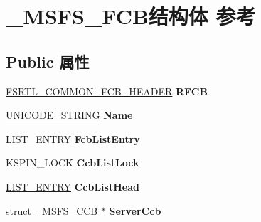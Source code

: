 \hypertarget{struct___m_s_f_s___f_c_b}{}\section{\+\_\+\+M\+S\+F\+S\+\_\+\+F\+C\+B结构体 参考}
\label{struct___m_s_f_s___f_c_b}
\subsection*{Public 属性}
\begin{DoxyCompactItemize}
\item 
\mbox{\label{struct___m_s_f_s___f_c_b_a3bf79aa4ff11a3e6f6f9dbb10cf91182}} 
\hyperlink{struct___f_s_r_t_l___c_o_m_m_o_n___f_c_b___h_e_a_d_e_r}{F\+S\+R\+T\+L\+\_\+\+C\+O\+M\+M\+O\+N\+\_\+\+F\+C\+B\+\_\+\+H\+E\+A\+D\+ER} {\bfseries R\+F\+CB}
\item 
\mbox{\label{struct___m_s_f_s___f_c_b_a2683262a7e5357d93e0bcc215387b9da}} 
\hyperlink{struct___u_n_i_c_o_d_e___s_t_r_i_n_g}{U\+N\+I\+C\+O\+D\+E\+\_\+\+S\+T\+R\+I\+NG} {\bfseries Name}
\item 
\mbox{\label{struct___m_s_f_s___f_c_b_af93da213be5b547d6215b2731fc06536}} 
\hyperlink{struct___l_i_s_t___e_n_t_r_y}{L\+I\+S\+T\+\_\+\+E\+N\+T\+RY} {\bfseries Fcb\+List\+Entry}
\item 
\mbox{\label{struct___m_s_f_s___f_c_b_ada9e82358d17e8c3413c68d8753f73cf}} 
K\+S\+P\+I\+N\+\_\+\+L\+O\+CK {\bfseries Ccb\+List\+Lock}
\item 
\mbox{\label{struct___m_s_f_s___f_c_b_af81ae992d2b8712ab19ac42ab2f26b17}} 
\hyperlink{struct___l_i_s_t___e_n_t_r_y}{L\+I\+S\+T\+\_\+\+E\+N\+T\+RY} {\bfseries Ccb\+List\+Head}
\item 
\mbox{\label{struct___m_s_f_s___f_c_b_a054f3e0a189e0370d21d1a16d2517859}} 
\hyperlink{interfacestruct}{struct} \hyperlink{struct___m_s_f_s___c_c_b}{\+\_\+\+M\+S\+F\+S\+\_\+\+C\+CB} $\ast$ {\bfseries Server\+Ccb}
\item 
\mbox{\label{struct___m_s_f_s___f_c_b_aed2307d8cbf5a0b45e84c46ed1a7332e}} 

\end{DoxyCompactItemize}
